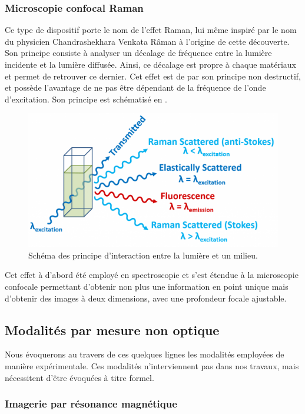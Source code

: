 \subsubsection{Microscopie confocal Raman}
Ce type de dispositif porte le nom de l'effet Raman, lui même inspiré par le nom du physicien Chandrashekhara Venkata Râman à  l'origine de cette découverte. Son principe consiste à analyser un décalage de fréquence entre la lumière incidente et la lumière diffusée. Ainsi, ce décalage est propre à chaque matériaux et permet de retrouver ce dernier. Cet effet est de par son principe non destructif, et possède l'avantage de ne pas être dépendant de la fréquence de l'onde d'excitation. Son principe est schématisé en .\par
\begin{figure}[H]
    \centering
    \includegraphics[width=0.8\linewidth]{contents/chapter_2/resources/raman_effect.png}
    \caption{Schéma des principe d'interaction entre la lumière et un milieu.}
    \label{fig:raman_effect}
\end{figure}\par
Cet effet à d'abord été employé en spectroscopie et s'est étendue à la microscopie confocale permettant d'obtenir non plus une information en point unique mais d'obtenir des images à deux dimensions, avec une profondeur focale ajustable.\par

\subsection{Modalités par mesure non optique}
Nous évoquerons au travers de ces quelques lignes les modalités employées de manière expérimentale. Ces modalités n’interviennent pas dans nos travaux, mais nécessitent d’être évoquées à titre formel.

\subsubsection{Imagerie par résonance magnétique}
